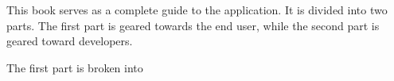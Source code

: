 This book serves as a complete guide to the \notelab application.  It is divided into two parts.  The first part 
is geared towards the end user, while the second part is geared toward developers.  

The first part is broken into 
